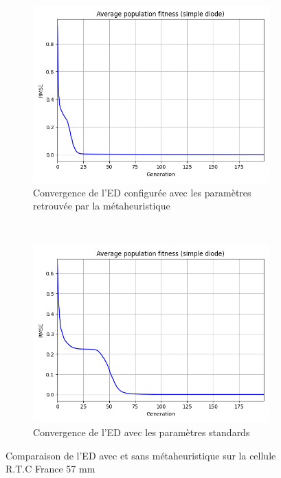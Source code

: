 \begin{figure}
    \centering
    \begin{subfigure}[b]{0.45\textwidth}
        \includegraphics[width=\textwidth]{resources/RTCFrance/metaconv.png}
        \caption{Convergence de l'ED configurée avec les paramètres retrouvée par la métaheuristique}
    \end{subfigure}
    ~
    \begin{subfigure}[b]{0.45\textwidth}
        \includegraphics[width=\textwidth]{resources/RTCFrance/stdconv.png}
        \caption{Convergence de l'ED avec les paramètres standards}
    \end{subfigure}
    \caption{Comparaison de l'ED avec et sans métaheuristique sur la cellule R.T.C France 57 mm}
    \label{fig:metaconv2}
\end{figure}%
